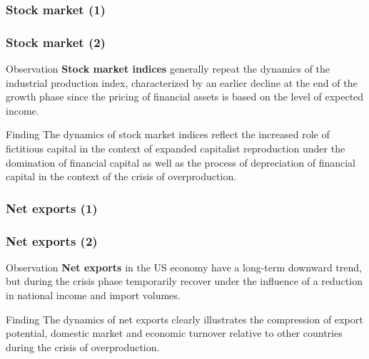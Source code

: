 \begin{frame}
  \frametitle{Stock market (1)}
  \begin{center}
  \end{center}
\end{frame}

\begin{frame}
  \frametitle{Stock market (2)}
  \begin{block}{Observation}
    \textbf{Stock market indices} generally repeat the dynamics of the industrial production index, characterized by an earlier decline at the end of the growth phase since the pricing of financial assets is based on the level of expected income.
  \end{block}

  \begin{alertblock}{Finding}
    The dynamics of stock market indices reflect the increased role of fictitious capital in the context of expanded capitalist reproduction under the domination of financial capital as well as the process of depreciation of financial capital in the context of the crisis of overproduction.
  \end{alertblock}
\end{frame}

\begin{frame}
  \frametitle{Net exports (1)}
  \begin{center}
  \end{center}
\end{frame}

\begin{frame}
  \frametitle{Net exports (2)}
  \begin{block}{Observation}
    \textbf{Net exports} in the US economy have a long-term downward trend, but during the crisis phase temporarily recover under the influence of a reduction in national income and import volumes.
  \end{block}

  \begin{alertblock}{Finding}
    The dynamics of net exports clearly illustrates the compression of export potential, domestic market and economic turnover relative to other countries during the crisis of overproduction.
  \end{alertblock}
\end{frame}

